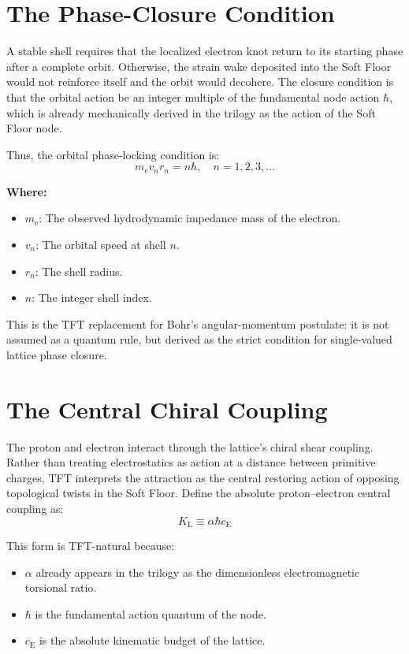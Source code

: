 \section{The Phase-Closure Condition}
A stable shell requires that the localized electron knot return to its starting phase after a complete orbit. Otherwise, the strain wake deposited into the Soft Floor would not reinforce itself and the orbit would decohere. The closure condition is that the orbital action be an integer multiple of the fundamental node action $\hbar$, which is already mechanically derived in the trilogy as the action of the Soft Floor node. 

Thus, the orbital phase-locking condition is:
\begin{equation}
    m_{\mathrm{e}} v_n r_n = n\hbar, \quad n=1,2,3,\dots
\end{equation}

\noindent\textbf{Where:}
\begin{itemize}
    \item $m_{\mathrm{e}}$: The observed hydrodynamic impedance mass of the electron.
    \item $v_n$: The orbital speed at shell $n$.
    \item $r_n$: The shell radius.
    \item $n$: The integer shell index.
\end{itemize}

This is the TFT replacement for Bohr's angular-momentum postulate: it is not assumed as a quantum rule, but derived as the strict condition for single-valued lattice phase closure.

\section{The Central Chiral Coupling}
The proton and electron interact through the lattice's chiral shear coupling. Rather than treating electrostatics as action at a distance between primitive charges, TFT interprets the attraction as the central restoring action of opposing topological twists in the Soft Floor. Define the absolute proton--electron central coupling as:
\begin{equation}
    K_{\mathrm{L}} \equiv \alpha\hbar c_{\mathrm{E}}
\end{equation}

This form is TFT-natural because:
\begin{itemize}
    \item $\alpha$ already appears in the trilogy as the dimensionless electromagnetic torsional ratio.
    \item $\hbar$ is the fundamental action quantum of the node.
    \item $c_{\mathrm{E}}$ is the absolute kinematic budget of the lattice.
\end{itemize}

